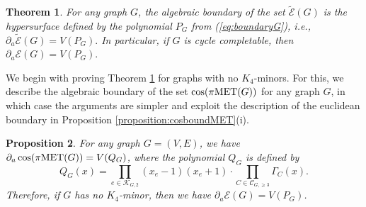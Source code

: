\documentclass[a4paper, 11pt, twoside]{article}
\newcommand{\ME}{{\mathcal E}}
\newcommand{\MET}{\text{\rm MET}}
\newcommand{\MK}{{\mathcal K}}
\newcommand{\MC}{{\mathcal C}}
\newcommand{\tME}{\widetilde \ME}
\theoremstyle{plain}
\newtheorem{theorem}{Theorem}[section]
\newtheorem{proposition}[theorem]{Proposition}
\begin{document}
\begin{theorem}\label{thm:boundary-cycle-completable}
For any graph $G$, the algebraic boundary of the set $\tME(G)$ is the hypersurface defined by the polynomial $P_G$ from   (\ref{eq:boundaryG}), 
i.e., $\partial_a\tME(G)= V(P_G).$ In particular, if $G$ is cycle completable, then $\partial_a\ME(G)= V(P_G).$
\end{theorem}

We begin with proving  Theorem \ref{thm:boundary-cycle-completable} for graphs with no $K_4$-minors. For this, we  describe  the algebraic boundary of the set $\cos(\pi\MET(G))$ for any graph $G$, in which case the arguments are simpler and exploit the description of the euclidean boundary in Proposition \ref{proposition:cosboundMET}(i).

\begin{proposition}\label{prop:aboundarycosMET}
For any graph $G=(V,E)$, we have $\partial_a \cos(\pi\MET(G)) = V(Q_G)$, where the polynomial $Q_G$ is defined by
\[
Q_G(x)=  \prod_{e\in \MK_{G,2}} (x_e-1)(x_e+1) \cdot \prod_{C\in \MC_{G,\ge 3}}   \Gamma_C(x).
\]
Therefore, if $G$ has no $K_4$-minor, then we have $\partial_a\ME(G)= V(P_G)$. 
\end{proposition}
\end{document}
